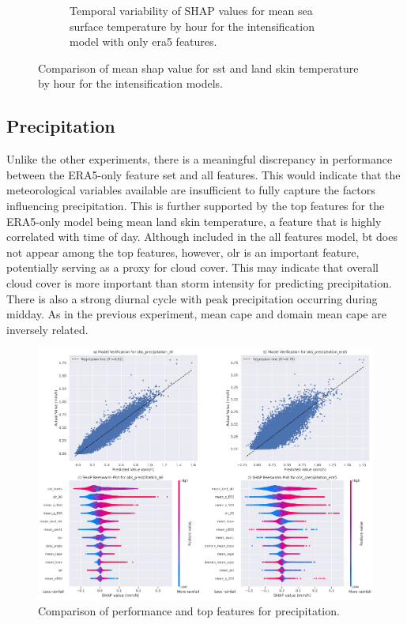 \begin{figure}[ht]
\begin{subfigure}[t]{\textwidth}
        \caption{Temporal variability of SHAP values for mean sea surface temperature by hour for the intensification model with only \acrshort{era5} features.}
        \label{fig:obs_intensification_era5_shap_mean_sst_by_hour}
    \end{subfigure}
    \caption{Comparison of mean \acrshort{shap} value for \acrshort{sst} and land skin temperature by hour for the intensification models.}
    \label{fig:obs_intensification_sst_skt_by_hour}
\end{figure}

\clearpage
\subsection{Precipitation}

Unlike the other experiments, there is a meaningful discrepancy in performance between the ERA5-only feature set and all features. This would indicate that the meteorological variables available are insufficient to fully capture the factors influencing precipitation. This is further supported by the top features for the ERA5-only model being mean land skin temperature, a feature that is highly correlated with time of day. Although included in the all features model, \acrfull{bt} does not appear among the top features, however, \acrfull{olr} is an important feature, potentially serving as a proxy for cloud cover. This may indicate that overall cloud cover is more important than storm intensity for predicting precipitation. There is also a strong diurnal cycle with peak precipitation occurring during midday. As in the previous experiment, mean \acrshort{cape} and domain mean \acrshort{cape} are inversely related.

\begin{figure}[ht]
    \centering
    \includegraphics[width=\textwidth]{../figures/generated/experiments/obs_precipitation/obs_precipitation_summary.png}
    \caption{Comparison of performance and top features for precipitation.}
    \label{fig:obs_precipitation_summary}
\end{figure}

